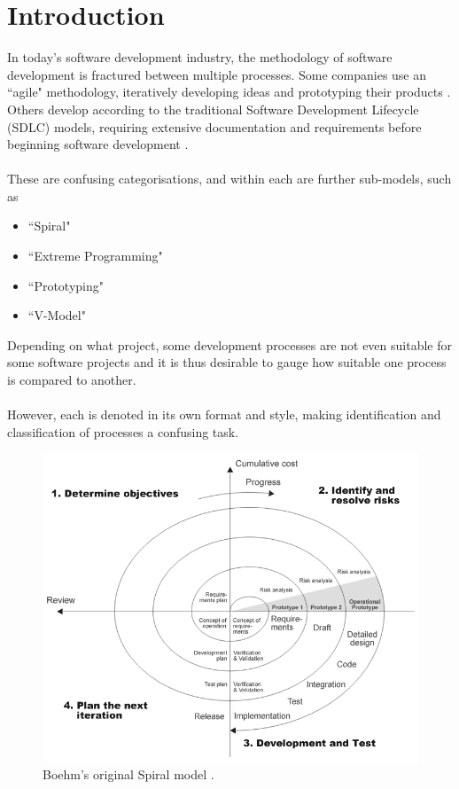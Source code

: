 \section{Introduction} \label{introduction}

In today's software development industry, the methodology of software development is fractured
between multiple processes.
Some companies use an ``agile" methodology, iteratively developing ideas and prototyping their
products \cite{gilb1999evolutionary}. %
Others develop according to the traditional Software Development Lifecycle (SDLC) models, requiring
extensive documentation and requirements before beginning software development \cite{Royce:1987:MDL:41765.41801}.\\
\\
These are confusing categorisations, and within each are further sub-models, such as
\begin{itemize}
	\item ``Spiral" \cite{Boehm:1986:SMS:12944.12948}
	\item ``Extreme Programming" \cite{beck2004extreme}
	\item ``Prototyping" \cite{Alavi:1984:APA:358080.358095}
	\item ``V-Model" \cite{forsberg1995relationship}
\end{itemize}
Depending on what project, some development processes are not even suitable for some software
projects and it is thus desirable to gauge how suitable one process is compared to another.\\
\\
However, each is denoted in its own format and style, making identification and classification of processes a
confusing task. %

\begin{figure}[ht!]
  \centering
  \includegraphics[scale=0.5]{media/Spiral_model_(Boehm,_1988)}
  \caption{Boehm's original Spiral model \cite{Boehm:1986:SMS:12944.12948}.}
  \label{BoehmOriSpiral}
\end{figure}

